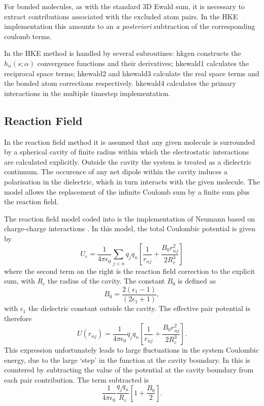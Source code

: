 For bonded molecules, as with the standard 3D Ewald sum, it is
necessary to extract contributions associated with the excluded atom
pairs. In the \D{} HKE implementation this amounts to an {\em a
posteriori} subtraction of the corresponding coulomb terms.

In \D{} the HKE method is handled by several subroutines: {\sc hkgen}
constructs the $h_{n}(s;\alpha)$ convergence functions and their
derivatives; {\sc hkewald1} calculates the reciprocal space terms;
{\sc hkewald2} and {\sc hkewald3} calculate the real space terms and
the bonded atom corrections respectively. {\sc hkewald4} calculates
the primary interactions in the multiple timestep implementation.

\subsection{Reaction Field}

In the reaction field method it is assumed that
any given molecule is surrounded by a spherical cavity of finite
radius within which the electrostatic interactions are calculated
explicitly. Outside the cavity the system is treated as a
dielectric 
continuum. The occurence of any net dipole within the cavity induces a
polarisation in the dielectric, which in turn interacts with the given
molecule. The model allows the replacement of the infinite Coulomb sum
by a finite sum plus the reaction field.

The reaction field model coded into \D{} is the implementation of
Neumann based on charge-charge interactions \cite{neumann-85a}. In
this model, the total Coulombic potential is given by
\begin{equation}
U_{c}=\frac{1}{4\pi\epsilon_{0}}\sum_{j<n}q_{j}q_{n}
\left [ \frac{1}{r_{nj}}+\frac{B_{0}r_{nj}^{2}}{2 R_{c}^{3}} \right ]
\end{equation}
where the second term on the right is the reaction field correction to
the explicit sum, with $R_{c}$ the radius of the cavity.  The constant
$B_{0}$ is defined as
\begin{equation}
B_{0}=\frac{2(\epsilon_{1}-1)}{(2\epsilon_{1}+1)},
\end{equation}
with $\epsilon_{1}$ the dielectric constant outside the cavity.
The effective pair potential is therefore
\begin{equation}
U(r_{nj})=\frac{1}{4\pi\epsilon_{0}} q_{j}q_{n}
\left [ \frac{1}{r_{nj}}+\frac{B_{0}r_{nj}^{2}}{2 R_{c}^{3}} \right ].
\end{equation}
This expression unfortunately leads to large fluctuations in the system
Coulombic energy, due to the large `step' in the function at the
cavity boundary. In \D{} this is countered by subtracting the value of
the potential at the cavity boundary from each pair contribution.  The
term subtracted is
\begin{equation}
\frac{1}{4\pi\epsilon_{0}} \frac{q_{j}q_{n}}{R_{c}}
\left [ 1+\frac{B_{0}}{2} \right ].
\end{equation}


